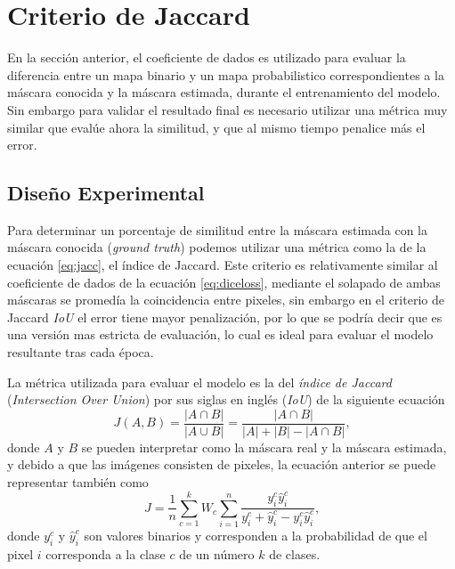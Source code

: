 \clearpage

\section{Criterio de Jaccard}
En la sección anterior, el coeficiente de dados es utilizado para evaluar la diferencia entre un mapa binario y un mapa probabilistico correspondientes a la máscara conocida y la máscara estimada, durante el entrenamiento del modelo. Sin embargo para validar el resultado final es necesario utilizar una métrica muy similar que evalúe ahora la similitud, y que al mismo tiempo penalice más el error.

\subsection{Diseño Experimental}
Para determinar un porcentaje de similitud entre la máscara estimada con la máscara conocida (\emph{ground truth}) podemos utilizar una métrica como la de la ecuación \ref{eq:jacc}, el índice de Jaccard. Este criterio es relativamente similar al coeficiente de dados de la ecuación \ref{eq:diceloss}, mediante el solapado de ambas máscaras se promedía la coincidencia entre pixeles, sin embargo en el criterio de Jaccard \emph{IoU} el error tiene mayor penalización, por lo que se podría decir que es una versión mas estricta de evaluación, lo cual es ideal para evaluar el modelo resultante tras cada época.

La métrica utilizada para evaluar el modelo es la del \emph{índice de Jaccard} (\emph{Intersection Over Union}) por sus siglas en inglés (\emph{IoU}) \citep{fpn_1} de la siguiente ecuación
\begin{equation}\label{eq:jacc}
    J(A,B) = \frac{|A \cap B|}{| A \cup B |} = \frac{|A \cap B|}{|A| + |B| - |A \cap B|} \text{,}
\end{equation} 
donde $A$ y $B$ se pueden interpretar como la máscara real y la máscara estimada, y debido a que las imágenes consisten de pixeles, la ecuación anterior se puede representar también como
\begin{equation}
    J = \frac{1}{n} \sum_{c=1}^{k} W_c \sum_{i=1}^{n}\frac{y_i^c \hat y_i^c}{y_i^c + \hat y_i^c - y_i^c \hat y_i^c} \text{,}
\end{equation} 
donde $y_i^c$ y $\hat y_i^c$ son valores binarios y corresponden a la probabilidad de que el pixel $i$ corresponda a la clase $c$ de un número $k$ de clases.

\def\rectA{(0,0) rectangle (2,2)}
\def\rectB{(1,-1) rectangle (3,1)}


